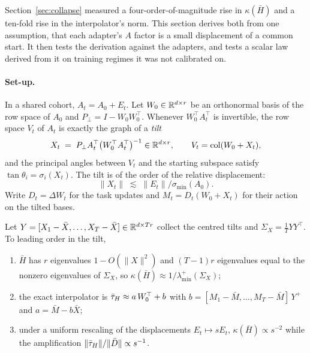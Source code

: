 Section~\ref{sec:collapse} measured a four-order-of-magnitude rise in
$\kappa(\bar H)$ and a ten-fold rise in the interpolator's norm. This section
derives both from one assumption, that each adapter's $A$ factor is a small
displacement of a common start. It then tests the derivation against the
adapters, and tests a scalar law derived from it on training regimes it was
not calibrated on.

\paragraph{Set-up.} In a shared cohort, $A_t = A_0 + E_t$. Let
$W_0 \in \mathbb{R}^{d\times r}$ be an orthonormal basis of the row space of $A_0$ and
$P_\perp = I - W_0 W_0^\top$. Whenever $W_0^\top A_t^\top$ is invertible, the
row space $V_t$ of $A_t$ is exactly the graph of a \emph{tilt}
\begin{equation}\label{eq:tilt}
  X_t \;=\; P_\perp A_t^\top \bigl(W_0^\top A_t^\top\bigr)^{-1} \in \mathbb{R}^{d\times r},
  \qquad V_t = \operatorname{col}(W_0 + X_t),
\end{equation}
and the principal angles between $V_t$ and the starting subspace satisfy
$\tan\theta_i = \sigma_i(X_t)$. The tilt is of the order of the relative
displacement:
\[
  \|X_t\| \;\lesssim\; \|E_t\| / \sigma_{\min}(A_0).
\]
Write
$D_t = \Delta W_t$ for the task updates and $M_t = D_t(W_0 + X_t)$ for their
action on the tilted bases.

\begin{proposition}
\label{prop:drift}
Let $Y = [X_1 - \bar X, \dots, X_T - \bar X] \in \mathbb{R}^{d\times Tr}$ collect the
centred tilts and $\Sigma_X = \tfrac1T Y Y^\top$. To leading order in the tilt,
\begin{enumerate}[leftmargin=*,itemsep=1pt,topsep=2pt]
\item $\bar H$ has $r$ eigenvalues $1 - O(\|X\|^2)$ and $(T-1)r$ eigenvalues
  equal to the nonzero eigenvalues of $\Sigma_X$, so
  $\kappa(\bar H) \approx 1/\lambda_{\min}^{+}(\Sigma_X)$;
\item the exact interpolator is $\bar{\tau}_H \approx a\,W_0^\top + b$ with
  $b = [M_1 - \bar M, \dots, M_T - \bar M]\, Y^{+}$ and $a = \bar M - b\bar X$;
\item under a uniform rescaling of the displacements $E_t \mapsto sE_t$,
  $\kappa(\bar H) \propto s^{-2}$ while the amplification
  $\|\bar{\tau}_H\|/\|\bar D\| \propto s^{-1}$.
\end{enumerate}
\end{proposition}

